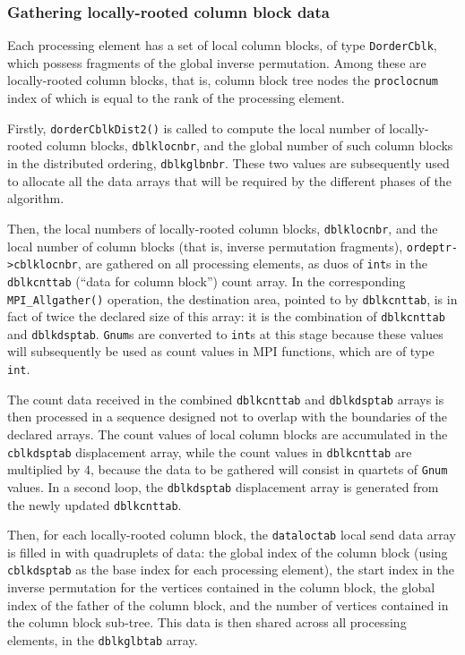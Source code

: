\subsubsection{Gathering locally-rooted column block data}

Each processing element has a set of local column blocks, of
type \texttt{Dorder\lbt Cblk}, which possess fragments of the global
inverse permutation. Among these are locally-rooted column blocks,
that is, column block tree nodes the \texttt{proc\lbt loc\lbt num}
index of which is equal to the rank of the processing element.

Firstly, \texttt{dorder\lbt Cblk\lbt Dist2()} is called to compute the
local number of locally-rooted column blocks, \texttt{dblklocnbr}, and
the global number of such column blocks in the distributed ordering,
\texttt{dblkglbnbr}. These two values are subsequently used to
allocate all the data arrays that will be required by the different
phases of the algorithm.

Then, the local numbers of locally-rooted column blocks,
\texttt{dblklocnbr}, and the local number of column blocks (that is,
inverse permutation fragments),
\texttt{ordeptr->\lbt cblk\lbt locnbr}, are gathered on all processing
elements, as duos of \texttt{int}s in the \texttt{dblkcnttab} (``data
for column block'') count array. In the corresponding
\texttt{MPI\_\lbt Allgather()} operation, the destination area,
pointed to by \texttt{dblkcnttab}, is in fact of twice the declared
size of this array: it is the combination of \texttt{dblkcnttab} and
\texttt{dblkdsptab}. \texttt{Gnum}s are converted to \texttt{int}s at
this stage because these values will subsequently be used as count
values in MPI functions, which are of type \texttt{int}.

The count data received in the combined \texttt{dblkcnttab} and
\texttt{dblkdsptab} arrays is then processed in a sequence designed
not to overlap with the boundaries of the declared arrays. The count
values of local column blocks are accumulated in the
\texttt{cblkdsptab} displacement array, while the count values in
\texttt{dblkcnttab} are multiplied by $4$, because the data to be
gathered will consist in quartets of \texttt{Gnum} values. In a second
loop, the \texttt{dblkdsptab} displacement array is generated
from the newly updated \texttt{dblkcnttab}.

Then, for each locally-rooted column block, the \texttt{dataloctab}
local send data array is filled in with quadruplets of data: the
global index of the column block (using \texttt{cblkdsptab} as the
base index for each processing element), the start index in the
inverse permutation for the vertices contained in the column block,
the global index of the father of the column block, and the number of
vertices contained in the column block sub-tree. This data is then
shared across all processing elements, in the \texttt{dblkglbtab}
array.

